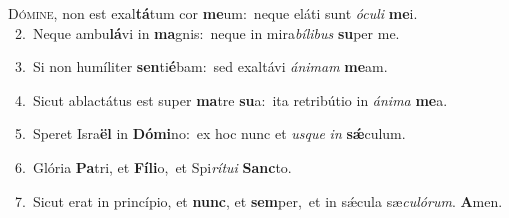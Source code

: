 \lettrine{\initial\textcolor{\initialcolor}{D}}{ómine,} non est exal\-\textbf{tá}\-tum cor \textbf{me}\-um:~\star neque eláti sunt \textit{ó}\-\textit{cu}\textit{li} \textbf{me}\-i.\\
{\numbfont\textcolor{\numbcolor}{~2.}}~Neque ambu\-\textbf{lá}\-vi in \textbf{ma}\-gnis:~\star neque in mira\-\textit{bí}\-\textit{li}\textit{bus} \textbf{su}\-per me.\par
{\numbfont\textcolor{\numbcolor}{~3.}}~Si non humíliter \textbf{sen}\-ti\-\textbf{é}\-bam:~\star sed exaltávi \textit{á}\-\textit{ni}\textit{mam} \textbf{me}\-am.\par
{\numbfont\textcolor{\numbcolor}{~4.}}~Sicut ablactátus est super \textbf{ma}\-tre \textbf{su}\-a:~\star ita retribútio in \textit{á}\-\textit{ni}\textit{ma} \textbf{me}\-a.\par
{\numbfont\textcolor{\numbcolor}{~5.}}~Speret Isra\textbf{ël} in \textbf{Dó}\-\textbf{mi}no:~\star ex hoc nunc et \textit{us}\-\textit{que} \textit{in} \textbf{sǽ}\-culum.\par
{\numbfont\textcolor{\numbcolor}{~6.}}~Glória \textbf{Pa}\-tri, et \textbf{Fí}\-\textbf{li}o,~\star et Spi\-\textit{rí}\-\textit{tu}\textit{i} \textbf{Sanc}\-to.\par
{\numbfont\textcolor{\numbcolor}{~7.}}~Sicut erat in princípio, et \textbf{nunc}\-, et \textbf{sem}\-per,~\star et in sǽcula sæ\-\textit{cu}\-\textit{ló}\textit{rum}. \textbf{A}\-men.\par
